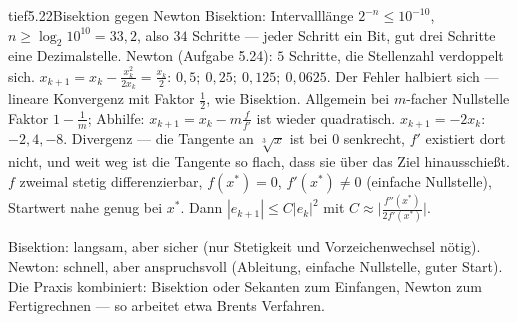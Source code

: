 \begin{loesungkarte}{tief}{5.22}{Bisektion gegen Newton}
Bisektion: Intervalllänge $2^{-n}\le10^{-10}$, $n\ge\log_2 10^{10} = 33{,}2$, also $34$ Schritte --- jeder Schritt ein Bit, gut drei Schritte eine Dezimalstelle. Newton (Aufgabe 5.24): $5$ Schritte, die Stellenzahl verdoppelt sich.
$x_{k+1} = x_k - \frac{x_k^{2}}{2x_k} = \frac{x_k}2$: $0{,}5;\ 0{,}25;\ 0{,}125;\ 0{,}0625$. Der Fehler halbiert sich --- lineare Konvergenz mit Faktor $\frac12$, wie Bisektion. Allgemein bei $m$-facher Nullstelle Faktor $1 - \frac1m$; Abhilfe: $x_{k+1} = x_k - m\frac{f}{f'}$ ist wieder quadratisch.
$x_{k+1} = -2x_k$: $-2, 4, -8$. Divergenz --- die Tangente an $\sqrt[3]x$ ist bei $0$ senkrecht, $f'$ existiert dort nicht, und weit weg ist die Tangente so flach, dass sie über das Ziel hinausschießt.
$f$ zweimal stetig differenzierbar, $f(x^{*}) = 0$, $f'(x^{*})\neq0$ (einfache Nullstelle), Startwert nahe genug bei $x^{*}$. Dann $|e_{k+1}|\le C|e_k|^{2}$ mit $C\approx\bigl|\frac{f''(x^{*})}{2f'(x^{*})}\bigr|$.
\begin{mitnehmen}\kastentext
Bisektion: langsam, aber sicher (nur Stetigkeit und Vorzeichenwechsel nötig). Newton: schnell, aber anspruchsvoll (Ableitung, einfache Nullstelle, guter Start). Die Praxis kombiniert: Bisektion oder Sekanten zum Einfangen, Newton zum Fertigrechnen --- so arbeitet etwa Brents Verfahren.
\end{mitnehmen}
\end{loesungkarte}

